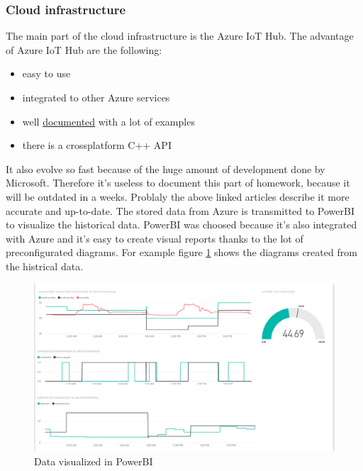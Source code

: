 \documentclass{article}
\begin{document}
\subsubsection{Cloud infrastructure}
The main part of the cloud infrastructure is the Azure IoT Hub. The advantage of Azure IoT Hub are the following:
\begin{itemize}
\item easy to use
\item integrated to other Azure services
\item well \href{https://docs.microsoft.com/en-us/azure/iot-hub/iot-hub-get-started}{documented} with a lot of examples
\item there is a crossplatform C++ API
\end{itemize}
It also evolve so fast because of the huge amount of development done by Microsoft. Therefore it's useless to document this part of homework, because it will be outdated in a weeks. Problaly the above linked articles describe it more accurate and up-to-date. The stored data from Azure is transmitted to PowerBI to visualize the historical data. PowerBI was choosed because it's also integrated with Azure and it's easy to create visual reports thanks to the lot of preconfigurated diagrams. For example figure \ref{fig:powerbi_screenshot} shows the diagrams created from the histrical data.
\begin{landscape}
\begin{figure}[!htb]
\centering
  \includegraphics[width=\linewidth]{imgs/powerbi_screenshot.png}
  \caption{Data visualized in PowerBI}
  \label{fig:powerbi_screenshot}
\end{figure}
\end{landscape}
\end{document}

